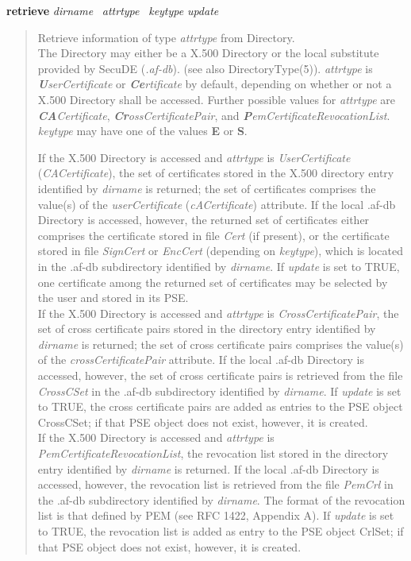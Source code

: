 {\bf retrieve} {\em dirname}~ {\em attrtype}~ {\em keytype} {\em update}
\begin{quote}
Retrieve information of type {\em attrtype} from Directory. \\
The Directory may either be a X.500 Directory or the local substitute provided by 
SecuDE ({\em .af-db}). (see also DirectoryType(5)).
{\em attrtype} is {\em {\bf U}serCertificate} or {\em {\bf Ce}rtificate} by default, depending on whether
or not a X.500 Directory shall be accessed. Further possible values for {\em attrtype} are
{\em {\bf CA}Certificate}, {\em {\bf Cr}ossCertificatePair}, and {\em {\bf P}emCertificateRevocationList}.
{\em keytype} may have one of the values {\bf E} or {\bf S}.
 
If the X.500 Directory is accessed and {\em attrtype} is {\em UserCertificate} ({\em CACertificate}), 
the set of certificates 
stored in the X.500 directory entry identified by {\em dirname} is returned; the set of 
certificates comprises the value(s) of the {\em userCertificate} ({\em cACertificate}) attribute. 
If the local .af-db Directory is accessed, however, the returned set of certificates either comprises
the certificate stored in file {\em Cert} (if present), or the certificate stored in file 
{\em SignCert} or {\em EncCert} (depending on {\em keytype}), which is located in 
the .af-db subdirectory identified by {\em dirname}.
If {\em update} is set to TRUE, one certificate among the returned set of certificates may
be selected by the user and stored in its PSE.\\
If the X.500 Directory is accessed and {\em attrtype} is {\em CrossCertificatePair}, 
the set of cross certificate 
pairs stored in the directory entry identified by {\em dirname} is returned; the set of 
cross certificate pairs comprises the value(s) of the {\em crossCertificatePair} attribute. 
If the local .af-db Directory is accessed, however, the set of cross certificate pairs is retrieved
from the file {\em CrossCSet} in the .af-db subdirectory identified by {\em dirname}.
If {\em update} is set to TRUE, the cross certificate pairs are added as entries 
to the PSE object CrossCSet; if that PSE object does not exist, however, it is created. \\
If the X.500 Directory is accessed and {\em attrtype} is {\em PemCertificateRevocationList}, 
the revocation list stored 
in the directory entry identified by {\em dirname} is returned. 
If the local .af-db Directory is accessed, however, the revocation list is retrieved from the
file {\em PemCrl} in the .af-db subdirectory identified by {\em dirname}.
The format of the revocation list is that defined by PEM (see RFC 1422, Appendix A). 
If {\em update} is set to TRUE, the revocation list is added as entry to the 
PSE object CrlSet; if that PSE object does not exist, however, it is created.
\end{quote}

